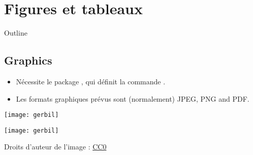 \documentclass{beamer}
\begin{document}
\section{Figures et tableaux}

\begin{frame}{Outline}
\begin{multicols}{2}
\tableofcontents[currentsection]
\end{multicols}
\end{frame}

\subsection{Graphics}
\begin{frame}[fragile]{\insertsubsection}
\begin{itemize}
\item Nécessite le package , qui définit la commande
.
\item Les formats graphiques prévus sont (normalement) JPEG, PNG and PDF.
\end{itemize}
\begin{exampletwouptiny}
\texttt{[image: gerbil]}

\texttt{[image: gerbil]}
\end{exampletwouptiny}

\tiny{Droits d'auteur de l'image : \href{https://pixabay.com/en/animal-apple-attractive-beautiful-1239390/}{CC0}}
\end{frame}
\end{document}
